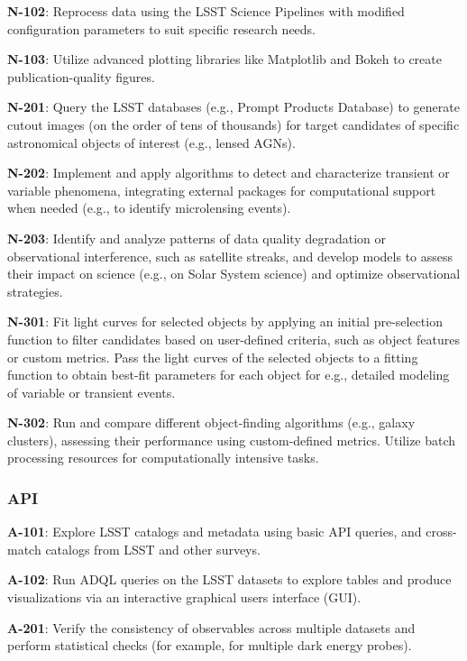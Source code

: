 \textbf{N-102}: Reprocess data using the LSST Science Pipelines with modified configuration parameters to suit specific research needs.

\textbf{N-103}: Utilize advanced plotting libraries like Matplotlib and Bokeh to create publication-quality figures.

\textbf{N-201}: Query the LSST databases (e.g., Prompt Products Database) to generate cutout images (on the order of tens of thousands) for target candidates of specific astronomical objects of interest (e.g., lensed AGNs).

\textbf{N-202}: Implement and apply algorithms to detect and characterize transient or variable phenomena, integrating external packages for computational support when needed (e.g., to identify microlensing events).

\textbf{N-203}: Identify and analyze patterns of data quality degradation or observational interference, such as satellite streaks, and develop models to assess their impact on science (e.g., on Solar System science) and optimize observational strategies.

\textbf{N-301}: Fit light curves for selected objects by applying an initial pre-selection function to filter candidates based on user-defined criteria, such as object features or custom metrics.
Pass the light curves of the selected objects to a fitting function to obtain best-fit parameters for each object for e.g.,  detailed modeling of variable or transient events. 

\textbf{N-302}: Run and compare different object-finding algorithms (e.g., galaxy clusters), assessing their performance using custom-defined metrics. Utilize batch processing resources for computationally intensive tasks.

\subsubsection{API}

\textbf{A-101}: Explore LSST catalogs and metadata using basic API queries, and cross-match catalogs from LSST and other surveys.

\textbf{A-102}: Run ADQL queries on the LSST datasets to explore tables and produce visualizations via an interactive graphical users interface (GUI).

\textbf{A-201}: Verify the consistency of observables across multiple datasets and perform statistical checks (for example, for multiple dark energy probes). 

